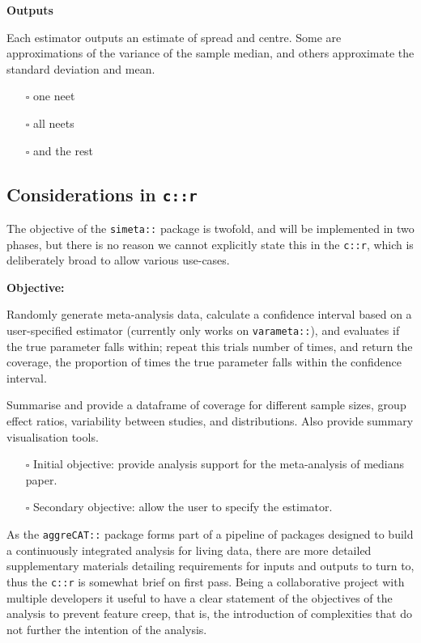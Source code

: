\documentclass[
]{article}
\providecommand{\tightlist}{%
  \setlength{\itemsep}{0pt}\setlength{\parskip}{0pt}}
\begin{document}
\textbf{Outputs}

Each estimator outputs an estimate of spread and centre. Some are approximations of the variance of the sample median, and others approximate the standard deviation and mean.

\begin{itemize}
\tightlist
\item[$\square$]
  one neet
\item[$\square$]
  all neets
\item[$\square$]
  and the rest
\end{itemize}

\hypertarget{considerations-in-cr}{%
\subsection{\texorpdfstring{Considerations in \texttt{c::r}}{Considerations in c::r}}\label{considerations-in-cr}}

The objective of the \texttt{simeta::} package is twofold, and will be implemented in two phases, but there is no reason we cannot explicitly state this in the \texttt{c::r}, which is deliberately broad to allow various use-cases.

\textbf{Objective:}

Randomly generate meta-analysis data, calculate a confidence interval based on a user-specified estimator (currently only works on \texttt{varameta::}), and evaluates if the true parameter falls within; repeat this \textbar trials\textbar{} number of times, and return the coverage, the proportion of times the true parameter falls within the confidence interval.

Summarise and provide a dataframe of coverage for different sample sizes, group effect ratios, variability between studies, and distributions. Also provide summary visualisation tools.

\begin{itemize}
\item[$\square$]
  Initial objective: provide analysis support for the meta-analysis of medians paper.
\item[$\square$]
  Secondary objective: allow the user to specify the estimator.
\end{itemize}

As the \texttt{aggreCAT::} package forms part of a pipeline of packages designed to build a continuously integrated analysis for living data, there are more detailed supplementary materials detailing requirements for inputs and outputs to turn to, thus the \texttt{c::r} is somewhat brief on first pass. Being a collaborative project with multiple developers it useful to have a clear statement of the objectives of the analysis to prevent feature creep, that is, the introduction of complexities that do not further the intention of the analysis.
\end{document}
